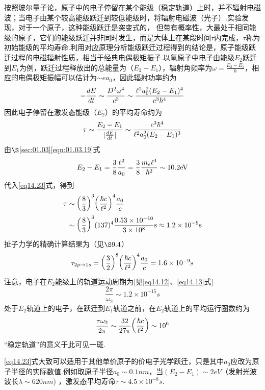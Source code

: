 按照玻尔量子论，原子中的电子停留在某个能级（稳定轨道）上时，并不辐射电磁波；当电子由某个较高能级跃迁到较低能级时，将辐射电磁波（光子）.实验发现，对于一个原子，这种能级跃迁是突变式的， 但带有概率性，大最处于相同能级的原子，它们的能级跃迁并非同时发生，而是大体上在某段时间$\tau$内完成，$\tau$称为初始能级的平均寿命.利用对应原理分析能级跃迁过程得到的结论是，原子能级跃迁过程的电磁辐射性质，相当于经典电偶极矩振子.以氢原子中电子由能级$E_{2}$跃迁到$E_{1}$为例，跃迁过程释放出的总能量为（$E_{2}-E_{1}$），辐射角频率为$\omega=\frac{E_{2}-E_{1}}{\hbar}$，相应的电偶极矩振幅可以估计为$\sim ea_{0}$，因此辐射功率约为
\begin{equation*}
	-\frac{dE}{dt}\sim\frac{D^{2}\omega^{4}}{c^{3}}\sim
	\frac{\e^{2}a_{0}^{2}(E_{2}-E_{1})^{4}}{c^{3}\hbar^{4}}
\end{equation*}
因此电子停留在激发态能级（$E_{2}$）的平均寿命约为
\begin{equation}\label{eq14.23}
	\tau\sim\frac{E_{2}-E_{1}}{|\frac{dE}{dt}|}\sim
	\frac{c^{3}\hbar^{4}}{\e^{2}a_{0}^{2}(E_{2}-E_{1})^{3}}
\end{equation}
由$\S$\ref{sec:01.03}\eqref{eqn:01.03.19}式
\begin{equation*}
	E_{2}-E_{1}=\frac{3}{8}\frac{\e^{2}}{a_{0}}=\frac{3}{8}\frac{m_{e}\e^{4}}{\hbar^{2}}\sim10.2\si{eV}
\end{equation*}
代入\eqref{eq14.23}式，得到
\eqlong
\begin{equation}\label{eq14.24}
	\begin{aligned}
		\tau &\sim \bigg(\frac{8}{3} \bigg)^{3} \bigg(\frac{\hbar c}{\e^{2}} \bigg)^{4} \frac{a_{0}}{c}  \\
		&\sim \bigg(\frac{8}{3} \bigg)^{3} (137)^{4} \frac{0.53\times10^{-10}}{3\times10^{8}}\si{s} \approx1.2\times10^{-9}\si{s}
	\end{aligned}
\end{equation}
扯子力学的精确计算结果为（见$\S 9.4$）%
\begin{equation}\label{eq14.25}
	\tau_{2p\rightarrow 1s}=
	\bigg(\frac{3}{2} \bigg)^{8} \bigg(\frac{\hbar c}{\e^{2}} \bigg)^{4} \frac{a_{0}}{c}=1.6\times10^{-9} \si{s}
\end{equation}\eqnormal
注意，电子在$E_{2}$能级上的轨道运动周期为[见\eqref{eq14.12}、\eqref{eq14.13}式]
\begin{equation*}
	\frac{2\pi}{\omega_{2}}\sim1.2\times10^{-15} \si{s}
\end{equation*}
处于$E_{2}$轨道上的电子，在跃迁到$E_{1}$轨道之前，在$E_{2}$轨道上的平均运行圈数约为
\begin{equation*}
	\frac{\tau\omega_{2}}{2\pi}\sim \frac{32}{27\pi} \bigg(\frac{\hbar c}{\e^{2}} \bigg)
	\sim 10^{6}
\end{equation*}
“稳定轨道”的意义于此可见一斑.

\eqref{eq14.23}式大致可以适用于其他单价原子的价电子光学跃迁，只是其中$a_{0}$应改为原子半径的实际数值.例如取原子半径$a_{0}\sim0.1 \si{nm}$，当$(E_{2}-E_{1})\sim 2\si{eV}$（发射光波波长$\lambda \sim620 \si{nm}$) ，激发态平均寿命$\tau\sim4.5\times10^{-8}\si{s}$.



